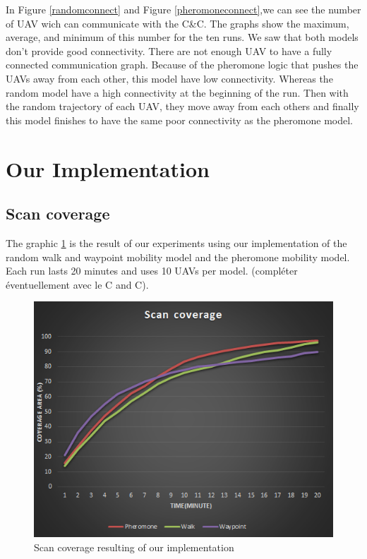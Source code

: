 In Figure \ref{randomconnect} and Figure \ref{pheromoneconnect},we can see the number of UAV wich can communicate with the C\&C.  The  graphs  show the maximum, average, and minimum of this number for the ten runs. We saw that both models don't provide good connectivity. There are not enough UAV to have a fully connected communication graph. Because of the pheromone logic that pushes the UAVs away from each other, this model have low connectivity. Whereas the random model have a high connectivity at the beginning of the run. Then with the random trajectory of each UAV, they move away from each others and finally this model finishes to have the same poor connectivity as the pheromone model.

\section{Our Implementation}

\subsection{Scan coverage}

The graphic \ref{scancoverage} is the result of our experiments using our implementation of the random walk and waypoint mobility model and the pheromone mobility model. Each run lasts 20 minutes and uses 10 UAVs per model. (compléter éventuellement avec le C and C).

\begin{figure}[!hbtf]
\centering
   \includegraphics{../images/ScanCoverageResult.png}
\caption{\label{scancoverage} Scan coverage resulting of our implementation}
\end{figure}

